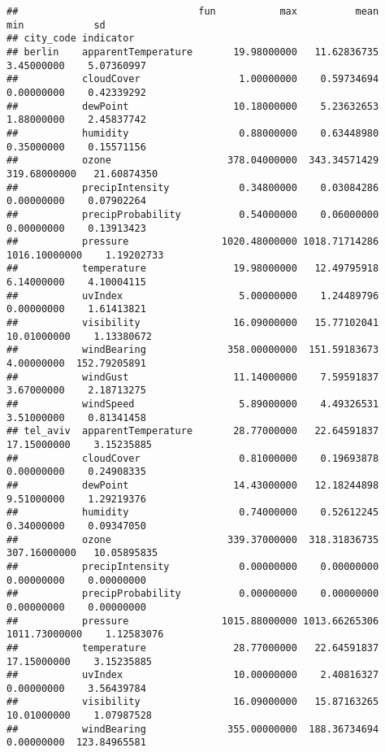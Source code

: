 \documentclass[]{book}
\begin{document}
\begin{verbatim}
##                               fun           max          mean           min            sd
## city_code indicator                                                                      
## berlin    apparentTemperature       19.98000000   11.62836735    3.45000000    5.07360997
##           cloudCover                 1.00000000    0.59734694    0.00000000    0.42339292
##           dewPoint                  10.18000000    5.23632653    1.88000000    2.45837742
##           humidity                   0.88000000    0.63448980    0.35000000    0.15571156
##           ozone                    378.04000000  343.34571429  319.68000000   21.60874350
##           precipIntensity            0.34800000    0.03084286    0.00000000    0.07902264
##           precipProbability          0.54000000    0.06000000    0.00000000    0.13913423
##           pressure                1020.48000000 1018.71714286 1016.10000000    1.19202733
##           temperature               19.98000000   12.49795918    6.14000000    4.10004115
##           uvIndex                    5.00000000    1.24489796    0.00000000    1.61413821
##           visibility                16.09000000   15.77102041   10.01000000    1.13380672
##           windBearing              358.00000000  151.59183673    4.00000000  152.79205891
##           windGust                  11.14000000    7.59591837    3.67000000    2.18713275
##           windSpeed                  5.89000000    4.49326531    3.51000000    0.81341458
## tel_aviv  apparentTemperature       28.77000000   22.64591837   17.15000000    3.15235885
##           cloudCover                 0.81000000    0.19693878    0.00000000    0.24908335
##           dewPoint                  14.43000000   12.18244898    9.51000000    1.29219376
##           humidity                   0.74000000    0.52612245    0.34000000    0.09347050
##           ozone                    339.37000000  318.31836735  307.16000000   10.05895835
##           precipIntensity            0.00000000    0.00000000    0.00000000    0.00000000
##           precipProbability          0.00000000    0.00000000    0.00000000    0.00000000
##           pressure                1015.88000000 1013.66265306 1011.73000000    1.12583076
##           temperature               28.77000000   22.64591837   17.15000000    3.15235885
##           uvIndex                   10.00000000    2.40816327    0.00000000    3.56439784
##           visibility                16.09000000   15.87163265   10.01000000    1.07987528
##           windBearing              355.00000000  188.36734694    0.00000000  123.84965581

\end{verbatim}
\end{document}
